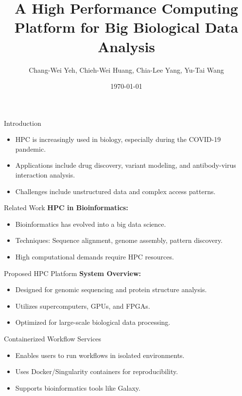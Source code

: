 \documentclass{beamer}
\title{A High Performance Computing Platform for Big Biological Data Analysis}
\author{Chang-Wei Yeh, Chieh-Wei Huang, Chia-Lee Yang, Yu-Tai Wang}
\institute{National Centre for High-Performance Computing, National Applied Research Laboratories, Hsinchu, Taiwan}
\date{\today}
\begin{document}
\frame{\titlepage}

\begin{frame}{Introduction}
    \begin{itemize}
        \item HPC is increasingly used in biology, especially during the COVID-19 pandemic.
        \item Applications include drug discovery, variant modeling, and antibody-virus interaction analysis.
        \item Challenges include unstructured data and complex access patterns.
    \end{itemize}
\end{frame}

\begin{frame}{Related Work}
    \textbf{HPC in Bioinformatics:}
    \begin{itemize}
        \item Bioinformatics has evolved into a big data science.
        \item Techniques: Sequence alignment, genome assembly, pattern discovery.
        \item High computational demands require HPC resources.
    \end{itemize}
\end{frame}

\begin{frame}{Proposed HPC Platform}
    \textbf{System Overview:}
    \begin{itemize}
        \item Designed for genomic sequencing and protein structure analysis.
        \item Utilizes supercomputers, GPUs, and FPGAs.
        \item Optimized for large-scale biological data processing.
    \end{itemize}
\end{frame}

\begin{frame}{Containerized Workflow Services}
    \begin{itemize}
        \item Enables users to run workflows in isolated environments.
        \item Uses Docker/Singularity containers for reproducibility.
        \item Supports bioinformatics tools like Galaxy.
    \end{itemize}
\end{frame}
\end{document}
